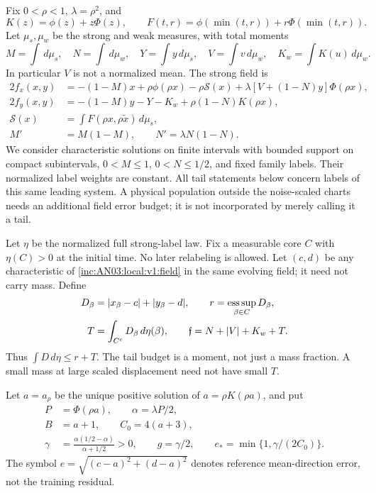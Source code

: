 \documentclass[11pt]{article}
\numberwithin{equation}{section}
\theoremstyle{remark}\newtheorem{remark}[theorem]{Remark}
\newcommand{\dd}{\,d}\newcommand{\E}{\mathbb E}
\begin{document}
Fix $0<\rho<1$, $\lambda=\rho^2$, and
\[
 K(z)=\phi(z)+z\Phi(z),\qquad
 F(t,r)=\phi(\min(t,r))+r\Phi(\min(t,r)).
\]
Let $\mu_s,\mu_w$ be the strong and weak measures, with total moments
\[
 M=\int\dd\mu_s,\quad N=\int\dd\mu_w,\quad
 Y=\int y\dd\mu_s,\quad V=\int v\dd\mu_w,\quad
 K_w=\int K(u)\dd\mu_w.
\]
In particular $V$ is not a normalized mean. The strong field is
\begin{align}
 2f_x(x,y)&=-(1-M)x+\rho\phi(\rho x)-\rho\mathcal S(x)
       +\lambda[V+(1-N)y]\Phi(\rho x),\label{inc:AN03:local:v1:field}\\
 2f_y(x,y)&=-(1-M)y-Y-K_w+\rho(1-N)K(\rho x),\nonumber\\
 \mathcal S(x)&=\int F(\rho x,\rho\widetilde x)\dd\mu_s,\nonumber\\
 M'&=M(1-M),\qquad N'=\lambda N(1-N).\label{inc:AN03:local:v1:mass}
\end{align}
We consider characteristic solutions on finite intervals with bounded
support on compact subintervals, $0<M\le1$, $0<N\le1/2$, and fixed
family labels. Their normalized label weights are constant. All tail
statements below concern labels of this same leading system. A physical
population outside the noise-scaled charts needs an additional field
error budget; it is not incorporated by merely calling it a tail.

Let $\eta$ be the normalized full strong-label law. Fix a measurable
core $C$ with $\eta(C)>0$ at the initial time. No later relabeling is
allowed. Let $(c,d)$ be any characteristic of \eqref{inc:AN03:local:v1:field}
in the same evolving field; it need not carry mass. Define
\begin{align}
 D_\beta&=|x_\beta-c|+|y_\beta-d|,\qquad
 r=\esssup_{\beta\in C}D_\beta,\nonumber\\
 T&=\int_{C^c}D_\beta\dd\eta(\beta),\qquad
 \mathfrak f=N+|V|+K_w+T.\label{inc:AN03:local:v1:forcing}
\end{align}
Thus $\int D\dd\eta\le r+T$. The tail budget is a moment, not just a
mass fraction. A small mass at large scaled displacement need not have
small $T$.

Let $a=a_\rho$ be the unique positive solution of $a=\rho K(\rho a)$,
and put
\begin{align}
 P&=\Phi(\rho a),\qquad \alpha=\lambda P/2,\nonumber\\
 B&=a+1,\qquad C_0=4(a+3),\nonumber\\
 \gamma&=\frac{\alpha(1/2-\alpha)}{\alpha+1/2}>0,
 \qquad g=\gamma/2,\qquad
 e_*=\min\{1,\gamma/(2C_0)\}.\label{inc:AN03:local:v1:constants}
\end{align}
The symbol $e=\sqrt{(c-a)^2+(d-a)^2}$ denotes reference mean-direction
error, not the training residual.
\end{document}

